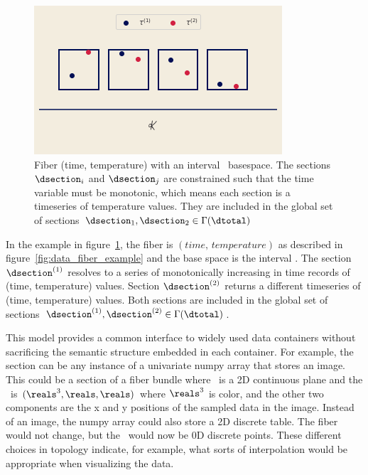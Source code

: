 \documentclass[../main.tex]{subfiles}
\begin{document}
\begin{figure}[H]
    \includegraphics[width=1\linewidth]{figures/math/fiberbundle.png}
    \caption{ Fiber (time, temperature) with an interval \dbase\ basespace. The sections $\dsection_i$ and $\dsection_j$ are constrained such that the time variable must be monotonic, which means each section is a timeseries of temperature values. They are included in the global set of sections  $\dsection_1, \dsection_2 \in \Gamma(\dtotal)$}
    \label{fig:data_sections}
\end{figure}

In the example in figure~\ref{fig:data_sections}, the fiber is $(time, \, temperature)$ as described in figure~\ref{fig:data_fiber_example} and the base space is the interval \dbase. The section $\dsection^{(1)}$ resolves to a series of monotonically increasing in time records of (time, temperature) values. Section $\dsection^{(2)}$ returns a different timeseries of (time, temperature) values. Both sections are included in the global set of sections $\dsection^{(1)}, \dsection^{(2)} \in \Gamma(\dtotal)$.


This model provides a common interface to widely used data containers without sacrificing the semantic structure embedded in each container. For example, the section can be any instance of a univariate numpy array\cite{harris2020array} that stores an image. This could be a section of a fiber bundle where \dbase\ is a 2D continuous plane and the \dfiber\ is $(\reals^{3}, \reals, \reals)$ where $\reals^3$ is color, and the other two components are the x and y positions of the sampled data in the image. Instead of an image, the numpy array could also store a 2D discrete table. The fiber would not change, but the \dbase\ would now be 0D discrete points. These different choices in topology indicate, for example, what sorts of interpolation would be appropriate when visualizing the data. 
\end{document}
